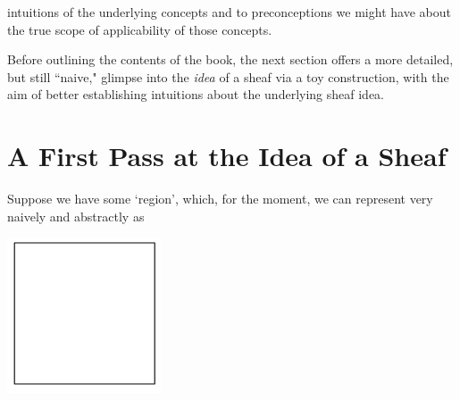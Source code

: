 \documentclass[a4paper]{book}
\theoremstyle{definition}
\theoremstyle{definition}
\theoremstyle{definition}
\theoremstyle{theorem}
\theoremstyle{definition}
\begin{document}
intuitions of the underlying concepts and to preconceptions we might have about the true scope of applicability of those concepts. \par 
	Before outlining the contents of the book, the next section offers a more detailed, but still ``naive," glimpse into the \textit{idea} of a sheaf via a toy construction, with the aim of better establishing intuitions about the underlying sheaf idea.  
	\section{A First Pass at the Idea of a Sheaf}
	Suppose we have some `region', which, for the moment, we can represent very naively and abstractly as 
	\begin{center}
		\includegraphics[scale=0.4]{Sketchpad.png}
	\end{center}
\end{document}
